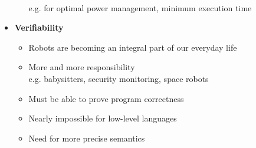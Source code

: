 \documentclass[hyperref={pdfpagelayout=SinglePage}]{beamer}
\begin{document}
\begin{frame}[allowframebreaks]
\begin{itemize}
\begin{itemize}
			\\ e.g. for optimal power management, minimum execution time
			\end{itemize}
		\framebreak
		\item \textbf{Verifiability} 
			\begin{itemize}
			\item Robots are becoming an integral part of our everyday life
			\item More and more responsibility
			\\ e.g. babysitters, security monitoring, space robots
			\item Must be able to prove program correctness
			\item Nearly impossible for low-level languages
			\item Need for more precise semantics
			\end{itemize}
		\end{itemize}
	\end{frame}
\end{document}
